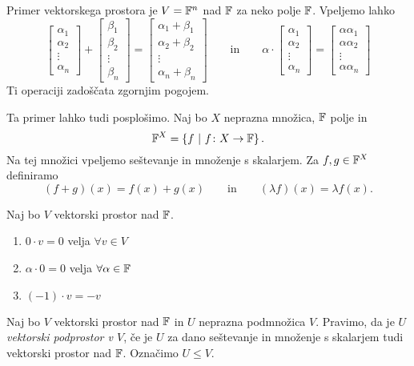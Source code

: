 \documentclass[12pt, a4paper]{article}
\begin{document}
Primer vektorskega prostora je $V=\mathbb{F}^n$ nad $\mathbb{F}$ za neko polje $\mathbb{F}$. Vpeljemo lahko
\[
\begin{bmatrix}
\alpha_1 \\
\alpha_2 \\
\vdots \\
\alpha_n
\end{bmatrix}
+
\begin{bmatrix}
\beta_1 \\
\beta_2 \\
\vdots \\
\beta_n
\end{bmatrix}
=
\begin{bmatrix}
\alpha_1+\beta_1 \\
\alpha_2+\beta_2 \\
\vdots \\
\alpha_n+\beta_n
\end{bmatrix}
\qquad
\text{in}
\qquad
\alpha\cdot
\begin{bmatrix}
\alpha_1 \\
\alpha_2 \\
\vdots \\
\alpha_n
\end{bmatrix}
=
\begin{bmatrix}
\alpha\alpha_1 \\
\alpha\alpha_2 \\
\vdots \\
\alpha\alpha_n
\end{bmatrix}
\]
Ti operaciji zadoščata zgornjim pogojem.

Ta primer lahko tudi posplošimo. Naj bo $X$ neprazna množica, $\mathbb{F}$ polje in
\[
\mathbb{F}^X=\left\{f~\middle\vert~f\colon X\to\mathbb{F}\right\}.
\]
Na tej množici vpeljemo seštevanje in množenje s skalarjem. Za $f,g\in\mathbb{F}^X$ definiramo
\[
(f+g)(x)=f(x)+g(x)\qquad\text{in}\qquad (\lambda f)(x)=\lambda f(x).
\]

\begin{trditev}
Naj bo $V$ vektorski prostor nad $\mathbb{F}$.

\begin{enumerate}[label=\roman*)]
\item $0\cdot v=0$ velja $\forall v\in V$
\item $\alpha\cdot 0=0$ velja $\forall \alpha\in\mathbb{F}$
\item $(-1)\cdot v=-v$
\end{enumerate}
\end{trditev}

\obvs

\begin{definicija}
Naj bo $V$ vektorski prostor nad $\mathbb{F}$ in $U$ neprazna podmnožica $V$. Pravimo, da je $U$ \emph{vektorski podprostor v $V$}, če je $U$ za dano seštevanje in množenje s skalarjem tudi vektorski prostor nad $\mathbb{F}$. Označimo $U\leq V$.
\end{definicija}
\end{document}
